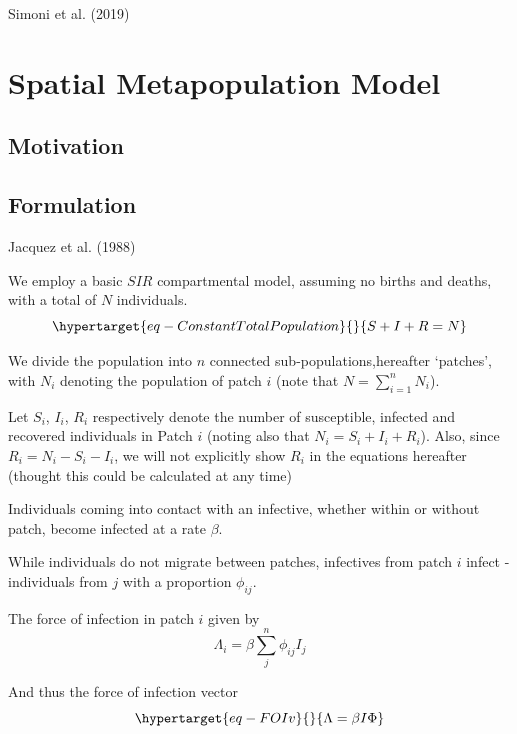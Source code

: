 \documentclass[
  letterpaper,
  DIV=11,
  numbers=noendperiod]{scrreprt}
\begin{document}
Simoni et al. (2019)

\hypertarget{sec-MPMspec}{%
\chapter{Spatial Metapopulation Model}\label{sec-MPMspec}}

\hypertarget{motivation}{%
\section{Motivation}\label{motivation}}

\hypertarget{formulation}{%
\section{Formulation}\label{formulation}}

Jacquez et al. (1988)

We employ a basic \(SIR\) compartmental model, assuming no births and
deaths, with a total of \(N\) individuals.
\begin{equation}\protect\hypertarget{eq-ConstantTotalPopulation}{}{ S + I  + R = N}\label{eq-ConstantTotalPopulation}\end{equation}

We divide the population into \(n\) connected sub-populations,hereafter
`patches', with \(N_i\) denoting the population of patch \(i\) (note
that \(N = \sum\limits_{i=1}^{n}N_i\)).

Let \(S_i\), \(I_i\), \(R_i\) respectively denote the number of
susceptible, infected and recovered individuals in Patch \(i\) (noting
also that \(N_i = S_i + I_i + R_i\)). Also, since
\(R_i = N_i - S_i - I_i\), we will not explicitly show \(R_i\) in the
equations hereafter (thought this could be calculated at any time)

Individuals coming into contact with an infective, whether within or
without patch, become infected at a rate \(\beta\).

While individuals do not migrate between patches, infectives from patch
\(i\) infect - individuals from \(j\) with a proportion \(\phi_{ij}\).

The force of infection in patch \(i\) given by \[
\Lambda_i = \beta \sum\limits_{j}^{n}\phi_{ij}I_j
\]

And thus the force of infection vector
\begin{equation}\protect\hypertarget{eq-FOIv}{}{\Lambda = \beta I \Phi}\label{eq-FOIv}\end{equation}
\end{document}
